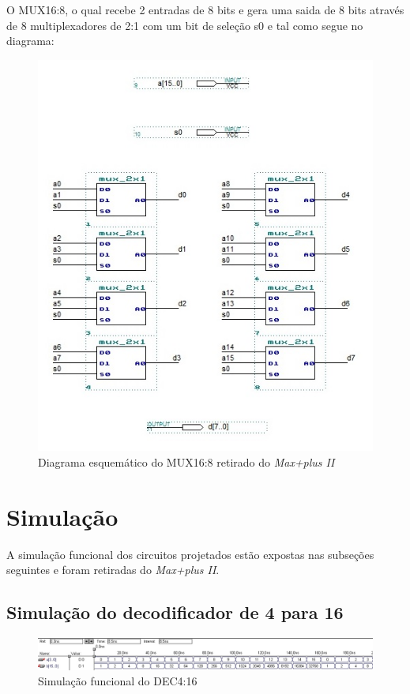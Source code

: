 \documentclass[a4paper]{article}
\begin{document}
	O MUX16:8, o qual recebe 2 entradas de 8 bits e gera uma saida de 8 bits através de 8 multiplexadores de 2:1 com um bit de seleção s0 e tal como segue no diagrama:
\begin{figure}[h]
  \centering
  \includegraphics[scale=0.73]{mux_16-8.jpg}
  \caption{Diagrama esquemático do MUX16:8 retirado do \emph{Max+plus II}}
\end{figure}



\FloatBarrier

\section{Simulação}

	A simulação funcional dos circuitos projetados estão expostas nas subseções seguintes e foram retiradas do \emph{Max+plus II}.

\subsection{Simulação do decodificador de 4 para 16}
\begin{figure}[h]
  \centering
  \includegraphics[scale=0.5]{lab07_simulacao_decodificador.jpg}
  \caption{Simulação funcional do DEC4:16}
\end{figure}
\end{document}
